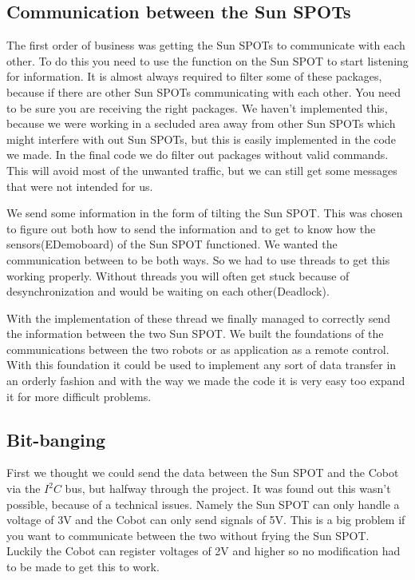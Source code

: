 \documentclass[a4paper,10pt]{article} %
\begin{document}

\subsection{Communication between the Sun SPOTs} %
\label{subsec:comm}

The first order of business was getting the Sun SPOTs to communicate with each
other. To do this you need to use the function on the Sun SPOT to start
listening for information. It is almost always required to filter some of these
packages, because if there are other Sun SPOTs communicating with each other.
You need to be sure you are receiving the right packages. We haven't implemented
this, because we were working in a secluded area away from other Sun SPOTs which
might interfere with out Sun SPOTs, but this is easily implemented in the code
we made. In the final code we do filter out packages without valid commands.
This will avoid most of the unwanted traffic, but we can still get some messages that were not intended for us.

We send some information in the form of tilting the Sun SPOT. This was chosen
to figure out both how to send the information and to get to know how the
sensors(EDemoboard) of the Sun SPOT functioned. We wanted the communication
between to be both ways. So we had to use threads to get this working properly.
Without threads you will often get stuck because of desynchronization and would
be waiting on each other(Deadlock).

With the implementation of these thread we finally managed to correctly send
the information between the two Sun SPOT. We built the foundations of the
communications between the two robots or as application as a remote control.
With this foundation it could be used to implement any sort of data transfer in
an orderly fashion and with the way we made the code it is very easy too expand
it for more difficult problems.


\subsection{Bit-banging} %
\label{subsec:bitbang}

First we thought we could send the data between the Sun SPOT and the Cobot via
the $I^2C$ bus, but halfway through the project. It was found out this wasn't
possible, because of a technical issues. Namely the Sun SPOT can only handle a
voltage of 3V and the Cobot can only send signals of 5V. This is a big problem
if you want to communicate between the two without frying the Sun SPOT. Luckily
the Cobot can register voltages of 2V and higher so no modification had to be
made to get this to work.
\end{document}
